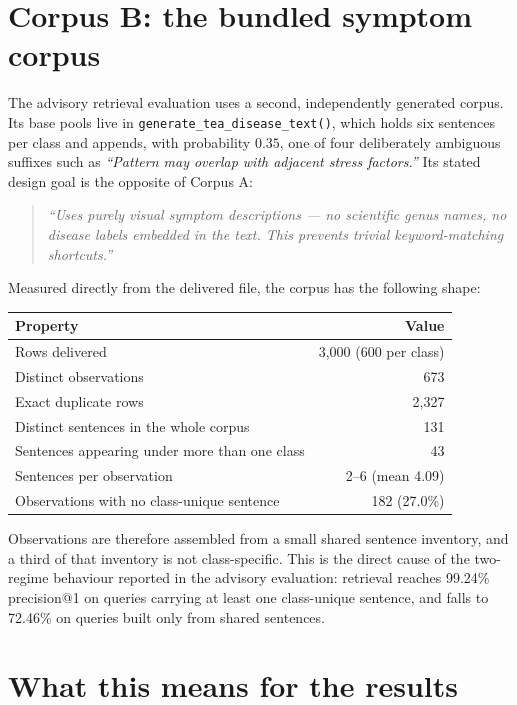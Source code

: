 \documentclass[11pt,a4paper]{article}
\newcommand{\code}[1]{\texttt{\small #1}}
\begin{document}
\section{Corpus B: the bundled symptom corpus}

The advisory retrieval evaluation uses a second, independently generated corpus.
Its base pools live in \code{generate\_tea\_disease\_text()}, which holds six
sentences per class and appends, with probability $0.35$, one of four
deliberately ambiguous suffixes such as \emph{``Pattern may overlap with
adjacent stress factors.''} Its stated design goal is the opposite of Corpus A:

\begin{quote}\small
\emph{``Uses purely visual symptom descriptions --- no scientific genus names, no
disease labels embedded in the text. This prevents trivial keyword-matching
shortcuts.''}
\end{quote}

\noindent
Measured directly from the delivered file, the corpus has the following shape:

\begin{center}
\small
\begin{tabular}{@{}lr@{}}
\toprule
Property & Value \\
\midrule
Rows delivered & 3{,}000 (600 per class)\\
Distinct observations & 673\\
Exact duplicate rows & 2{,}327\\
Distinct sentences in the whole corpus & 131\\
Sentences appearing under more than one class & 43\\
Sentences per observation & 2--6 (mean 4.09)\\
Observations with no class-unique sentence & 182 (27.0\%)\\
\bottomrule
\end{tabular}
\end{center}

\noindent
Observations are therefore assembled from a small shared sentence inventory, and
a third of that inventory is not class-specific. This is the direct cause of the
two-regime behaviour reported in the advisory evaluation: retrieval reaches
99.24\% precision@1 on queries carrying at least one class-unique sentence, and
falls to 72.46\% on queries built only from shared sentences.

\section{What this means for the results}
\end{document}
